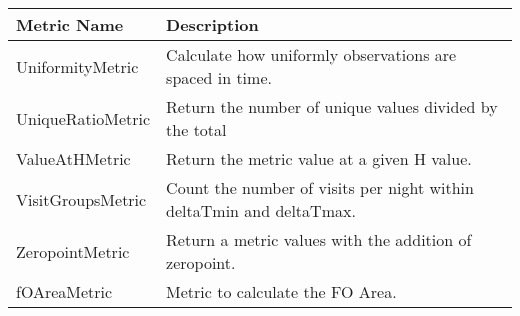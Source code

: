 \begin{table}
\scriptsize
\begin{tabular}{ll}
\hline
       Metric Name &                                                           Description \\
\hline
 UniformityMetric &  Calculate how uniformly observations are spaced in time. \\
 UniqueRatioMetric &  Return the number of unique values divided by the total \\
 ValueAtHMetric &  Return the metric value at a given H value. \\
 VisitGroupsMetric &  Count the number of visits per night within deltaTmin and deltaTmax. \\
 ZeropointMetric &  Return a metric values with the addition of zeropoint. \\
 fOAreaMetric &  Metric to calculate the FO Area. \\
\hline
\end{tabular}

\end{table}
